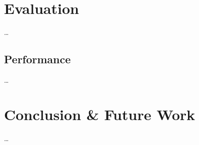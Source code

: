 \documentclass[intern]{cgMA}
\begin{document}
    \pagebreak
    \section{Evaluation} \label{sec:results}
    \dots
    
    \subsection{Performance}
    \dots
    \pagebreak
    \section{Conclusion \& Future Work}  \label{sec:end}
    \dots
    \pagebreak
    \listoffigures
    \pagebreak
    \printbibliography
\end{document}
